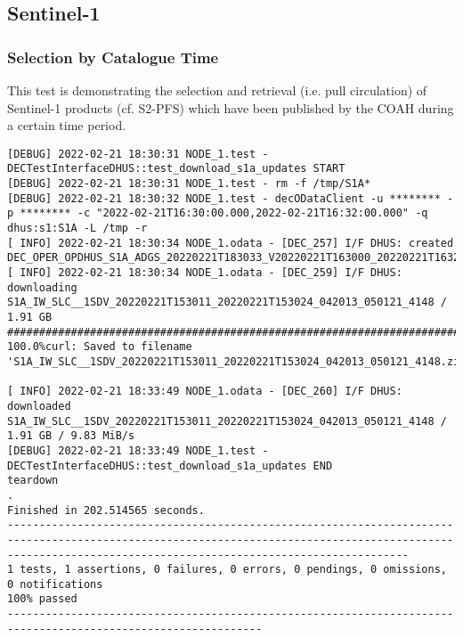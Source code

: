 \documentclass[dec_sum_main.tex]{subfiles}
\begin{document}
\subsection{Sentinel-1}

\subsubsection{Selection by Catalogue Time}
This test is demonstrating the selection and retrieval (i.e. pull circulation) of Sentinel-1 products (cf. S2-PFS) which have been published by the COAH during a certain time period. \newline

 \newline

\begin{Verbatim}[fontsize=\tiny]
[DEBUG] 2022-02-21 18:30:31 NODE_1.test - DECTestInterfaceDHUS::test_download_s1a_updates START
[DEBUG] 2022-02-21 18:30:31 NODE_1.test - rm -f /tmp/S1A*
[DEBUG] 2022-02-21 18:30:32 NODE_1.test - decODataClient -u ******** -p ******** -c "2022-02-21T16:30:00.000,2022-02-21T16:32:00.000" -q dhus:s1:S1A -L /tmp -r
[ INFO] 2022-02-21 18:30:34 NODE_1.odata - [DEC_257] I/F DHUS: created DEC_OPER_OPDHUS_S1A_ADGS_20220221T183033_V20220221T163000_20220221T163200_1_0.xml
[ INFO] 2022-02-21 18:30:34 NODE_1.odata - [DEC_259] I/F DHUS: downloading S1A_IW_SLC__1SDV_20220221T153011_20220221T153024_042013_050121_4148 / 1.91 GB
#################################################################################################################################################################################################### 100.0%curl: Saved to filename 'S1A_IW_SLC__1SDV_20220221T153011_20220221T153024_042013_050121_4148.zip'

[ INFO] 2022-02-21 18:33:49 NODE_1.odata - [DEC_260] I/F DHUS: downloaded S1A_IW_SLC__1SDV_20220221T153011_20220221T153024_042013_050121_4148 / 1.91 GB / 9.83 MiB/s
[DEBUG] 2022-02-21 18:33:49 NODE_1.test - DECTestInterfaceDHUS::test_download_s1a_updates END
teardown
.
Finished in 202.514565 seconds.
-----------------------------------------------------------------------------------------------------------------------------------------------------------------------------------------------------------
1 tests, 1 assertions, 0 failures, 0 errors, 0 pendings, 0 omissions, 0 notifications
100% passed
--------------------------------------------------------------------------------------------------------------
\end{Verbatim}
\end{document}
